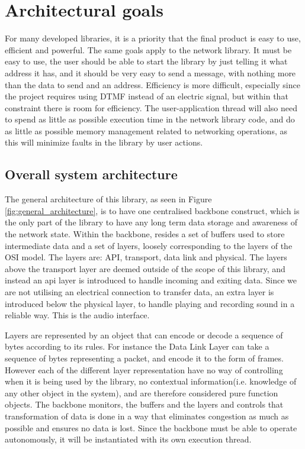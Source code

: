 \section{Architectural goals}
For many developed libraries, it is a priority that the final product is easy to use, efficient and powerful.  The same goals apply to the network library. It must be easy to use, the user should be able to start the library by just telling it what address it has, and it should be very easy to send a message, with nothing more than the data to send and an address. Efficiency is more difficult, especially since the project requires using DTMF instead of an electric signal, but within that constraint there is room for efficiency.
The user-application thread will also need to spend as little as possible execution time in the network library code, and do as little as possible memory management related to networking operations, as this will minimize faults in the library by user actions.



\subsection{Overall system architecture}
The general architecture of this library, as seen in Figure \ref{fig:general_architecture}, is to have one centralised backbone construct, which is the only part of the library to have any long term data storage and awareness of the network state. 
Within the backbone, resides a set of buffers used to store intermediate data and a set of layers, loosely corresponding to the layers of the OSI model.
The layers are: API, transport, data link and physical.
The layers above the transport layer are deemed outside of the scope of this library, and instead an api layer is introduced to handle incoming and exiting data. Since we are not utilising an electrical connection to transfer data, an extra layer is introduced below the physical layer, to handle playing and recording sound in a reliable way. This is the audio interface.









Layers are represented by an object that can encode or decode a sequence of bytes according to its rules. For instance the Data Link Layer can take a sequence of bytes representing a packet, and encode it to the form of frames.
However each of the different layer representation have no way of controlling when it is being used by the library, no contextual information(i.e. knowledge of any other object in the system), and are therefore considered pure function objects.
The backbone monitors, the buffers and the layers and controls that transformation of data is done in a way that eliminates congestion as much as possible and ensures no data is lost. Since the backbone must be able to operate autonomously, it will be instantiated with its own execution thread. 

